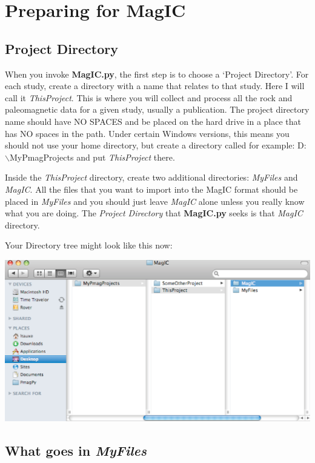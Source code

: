 \documentclass[11pt]{book}
\begin{document}
{\section{Preparing for MagIC}
\subsection{Project Directory}

 When you invoke {\bf MagIC.py}, the first step is to choose a `Project Directory'. For each study, create a directory with a name that relates to that study. Here I will call it {\it ThisProject}.  This is where you will collect  and process all the rock and paleomagnetic data for a given study, usually a publication.   The project directory name should have NO SPACES and be placed on the hard drive in a place that has NO spaces in the path. Under certain Windows versions, this means you should not use your home directory, but create a directory called for example: D:$\backslash$MyPmagProjects and put {\it ThisProject} there.

Inside the  {\it ThisProject} directory, create two additional directories: {\it MyFiles} and {\it MagIC}. All the files that you want to import into the MagIC format should be placed in {\it MyFiles} and you should just leave {\it MagIC} alone unless you really know what you are doing.  The {\it Project Directory} that {\bf MagIC.py} seeks is that {\it MagIC} directory.

Your Directory tree might look like this now:

\includegraphics[width=15cm]{EPSfiles/ProjectDirectory.eps}

\subsection{What goes in {\it MyFiles}}

}
\end{document}
